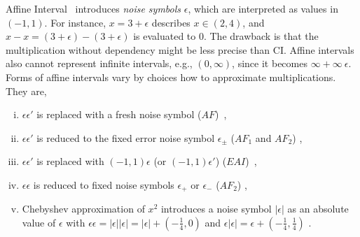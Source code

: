 \documentclass[runningheads,a4paper,oribibl]{llncs}
\newcommand{\suppress}[1]{} %
\begin{document}
Affine Interval~\cite{Comba93affinearithmetic, Stolfi97self-validatednumerical} introduces \emph{noise symbols} $\epsilon$, 
which are interpreted as values in $(-1,1)$. 
For instance, $x = 3 + \epsilon$ describes $x \in (2,4)$, and 
$x - x = (3 + \epsilon) - (3 + \epsilon)$ is evaluated to $0$. 
The drawback is that the multiplication without dependency might be less precise than CI.
Affine intervals also cannot represent infinite intervals, e.g., $(0,\infty)$, 
since it becomes $\infty + \infty~\epsilon$. 
Forms of affine intervals vary by choices how to approximate multiplications. They are,
\begin{enumerate}[(i)]
\item $\epsilon \epsilon'$ is replaced with a fresh noise symbol 
($AF$)~\cite{Comba93affinearithmetic, Stolfi97self-validatednumerical}, 
\item $\epsilon \epsilon'$ is reduced to the fixed error noise symbol 
$\epsilon_{\pm}$ ($AF_1$ and $AF_2$) \cite{Messine_extensionsof},
\item $\epsilon \epsilon'$ is replaced with $(-1,1) \epsilon$ 
(or $(-1,1) \epsilon'$) ($EAI$)~\cite{Ngoc:2009:ORE:1685167.1685421},
\item $\epsilon \epsilon$ is reduced to fixed noise symbols 
$\epsilon_+$ or $\epsilon_{-}$ ($AF_2$) \cite{Messine_extensionsof}, 
\item Chebyshev approximation of $x^2$ introduces a noise symbol $|\epsilon|$ 
as an absolute value of $\epsilon$ with 
$\epsilon \epsilon = |\epsilon| |\epsilon| = |\epsilon| + (-\frac{1}{4}, 0)$ and
$\epsilon |\epsilon| = \epsilon + (-\frac{1}{4}, \frac{1}{4})$ \cite{VanKhanh201227}. 
\end{enumerate} 

\suppress{
\begin{remark}
For Affine intervals, \emph{sensitivity}~\cite{ngocsefm} of a variable
is a possible range of the absolute value of the coefficient of its corresponding $\epsilon$. 


Note that Affine interval works only for bounded intervals. 
For instance, $\infty + \infty \epsilon$ represents $(-\infty,\infty)$, which says nothing. 
Narrowing intervals as an incremental search (Section~\ref{sec:incsearch}) partilly depends on this fact. 
That is, if $\pm \infty$ is contained in an interval, first give finite upper/lower bounds and search 
within these bounds using an Affine interval. If UNSAT is concluded, then enlarge to the whole intervals 
using CI. 
\end{remark}
}
\end{document}
